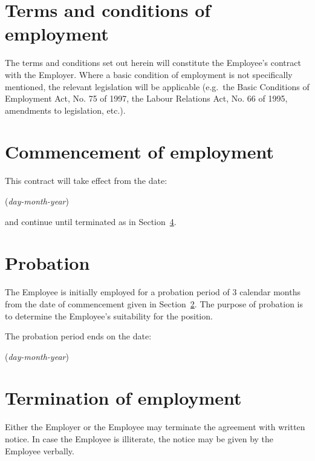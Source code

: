 \documentclass[a4paper,11pt]{article}
\begin{document}
\noindent\hrulefill %

\section{Terms and conditions of employment}

\para The terms and conditions set out herein will constitute the Employee's
contract with the Employer. Where a basic condition of employment is not
specifically mentioned, the relevant legislation will be applicable (e.g.\ the
Basic Conditions of Employment Act, No. 75 of 1997, the Labour Relations Act,
No. 66 of 1995, amendments to legislation, etc.).

\section{Commencement of employment}
\label{commencement}

\para This contract will take effect from the date:

\begin{center}

  (\textit{day-month-year})
\end{center}

\noindent and continue until terminated as in Section~\ref{termination}.

\section{Probation}
\label{probation}

\para The Employee is initially employed for a probation period of 3 calendar
months from the date of commencement given in Section~\ref{commencement}. The
purpose of probation is to determine the Employee's suitability for the
position.

\para The probation period ends on the date:

\begin{center}

  (\textit{day-month-year})
\end{center}

\section{Termination of employment}
\label{termination}

\para Either the Employer or the Employee may terminate the agreement with
written notice. In case the Employee is illiterate, the notice may be given by
the Employee verbally.
\end{document}
